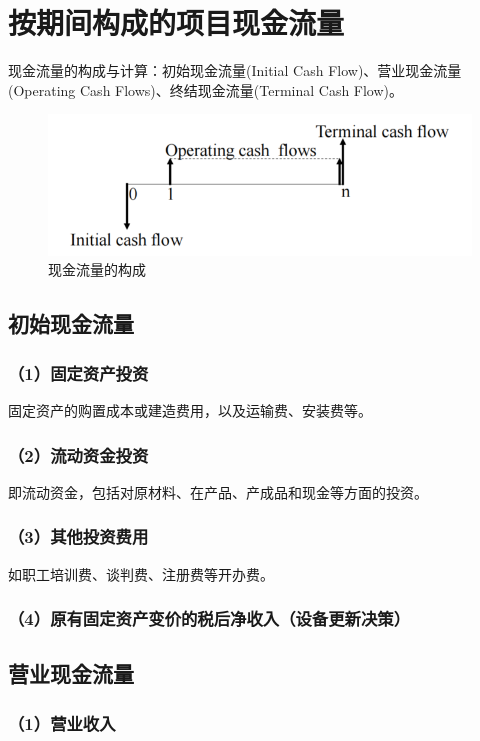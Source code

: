 \section{按期间构成的项目现金流量}

现金流量的构成与计算：初始现金流量(Initial Cash Flow)、营业现金流量(Operating Cash Flows)、终结现金流量(Terminal Cash Flow)。

\begin{figure}[H]
    \centering
    \includegraphics[width=0.8\linewidth]{image/现金流量的构成.png}
    \caption{现金流量的构成}
\end{figure}

\subsection{初始现金流量}
\subsubsection{（1）固定资产投资}
固定资产的购置成本或建造费用，以及运输费、安装费等。
\subsubsection{（2）流动资金投资}
即流动资金，包括对原材料、在产品、产成品和现金等方面的投资。
\subsubsection{（3）其他投资费用}
如职工培训费、谈判费、注册费等开办费。
\subsubsection{（4）原有固定资产变价的税后净收入（设备更新决策）}


\subsection{营业现金流量}
\subsubsection{（1）营业收入}
